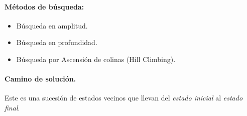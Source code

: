 \documentclass[12pt]{article}
\begin{document}
	\paragraph{Métodos de búsqueda:}
	\begin{itemize}
		\item Búsqueda en amplitud.
		\item Búsqueda en profundidad.
		\item Búsqueda por Ascensión de colinas (Hill Climbing).
	\end{itemize} 
	\pagebreak
	\paragraph{Camino de solución. }Este es una sucesión de estados vecinos que llevan del \textit{estado inicial} al \textit{estado final}. \\
	
\end{document}
